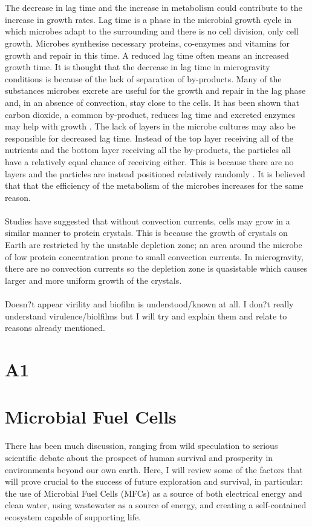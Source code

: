 \documentclass[12pt]{article}
\begin{document}
\\ \\The decrease in lag time and the increase in metabolism could contribute to the increase in growth rates. Lag time is a phase in the microbial growth cycle in which microbes adapt to the surrounding and there is no cell division, only cell growth.  Microbes synthesise necessary proteins, co-enzymes and vitamins for growth and repair in this time. A reduced lag time often means an increased growth time.  It is thought that the decrease in lag time in microgravity conditions is because of the lack of separation of by-products. Many of the substances microbes excrete are useful for the growth and repair in the lag phase and, in an absence of convection, stay close to the cells. It has been shown that carbon dioxide, a common by-product, reduces lag time and excreted enzymes may help with growth . The lack of layers in the microbe cultures may also be responsible for decreased lag time. Instead of the top layer receiving all of the nutrients and the bottom layer receiving all the by-products, the particles all have a relatively equal chance of receiving either. This is because there are no layers and the particles are instead positioned relatively randomly . It is believed that that the efficiency of the metabolism of the microbes increases for the same reason.
\\ \\Studies have suggested that without convection currents, cells may grow in a similar manner to protein crystals.  This is because the growth of crystals on Earth are restricted by the unstable depletion zone; an area around the microbe of low protein concentration prone to small convection currents. In microgravity, there are no convection currents so the depletion zone is quasistable which causes larger and more uniform growth of the crystals. \\ \\
Doesn?t appear virility and biofilm is understood/known at all. I don?t really understand virulence/biolfilms but I will try and explain them and relate to reasons already mentioned.

\section{A1}

\section{Microbial Fuel Cells}
There has been much discussion, ranging from wild speculation to serious scientific debate about the prospect of human survival and prosperity in environments beyond our own earth. Here, I will review some of the factors that will prove crucial to the success of future exploration and survival, in particular: the use of Microbial Fuel Cells (MFCs) as a source of both electrical energy and clean water, using wastewater as a source of energy, and creating a self-contained ecosystem capable of supporting life. 
\end{document}
